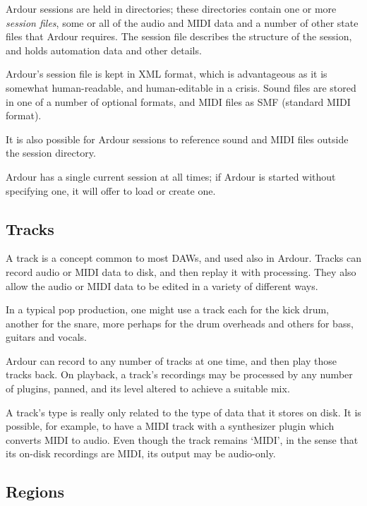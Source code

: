 \documentclass[10pt,a4paper]{book}
\begin{document}
Ardour sessions are held in directories; these directories contain one
or more \emph{session files}, some or all of the audio and MIDI data
and a number of other state files that Ardour requires.  The session
file describes the structure of the session, and holds automation data
and other details.

\begin{danger}
Ardour's session file is kept in XML format, which is advantageous as
it is somewhat human-readable, and human-editable in a crisis.  Sound
files are stored in one of a number of optional formats, and MIDI
files as SMF (standard MIDI format).

It is also possible for Ardour sessions to reference sound and MIDI
files outside the session directory.
\end{danger}

Ardour has a single current session at all times; if Ardour is started
without specifying one, it will offer to load or create one.



\subsection{Tracks}

A track is a concept common to most DAWs, and used also in Ardour.
Tracks can record audio or MIDI data to disk, and then replay it with
processing.  They also allow the audio or MIDI data to be edited in a
variety of different ways.

In a typical pop production, one might use a track each for the kick
drum, another for the snare, more perhaps for the drum overheads and
others for bass, guitars and vocals.

Ardour can record to any number of tracks at one time, and then play
those tracks back.  On playback, a track's recordings may be processed
by any number of plugins, panned, and its level altered to achieve a
suitable mix.

\begin{danger}
A track's type is really only related to the type of data that it
stores on disk.  It is possible, for example, to have a MIDI track
with a synthesizer plugin which converts MIDI to audio.  Even though
the track remains `MIDI', in the sense that its on-disk recordings are
MIDI, its output may be audio-only.
\end{danger}


\subsection{Regions}
\end{document}
